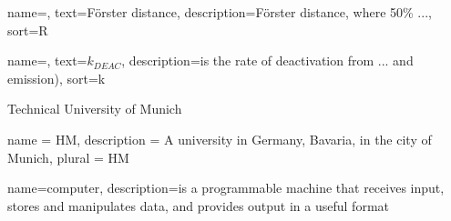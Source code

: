 


{
name=,
text=F\"{o}rster distance,
description={F\"{o}rster distance, where 50\% ...},
sort=R
}

{
    name=,
    text=$k_{DEAC}$,
    description={is the rate of deactivation from ... and emission)},
    sort=k
}

{Technical University of Munich}

{
    name = HM,
    description = {A university in Germany, Bavaria, in the city of Munich},
    plural = HM
}

{
    name=computer,
    description={is a programmable machine that receives input,
            stores and manipulates data, and provides
            output in a useful format}
}
